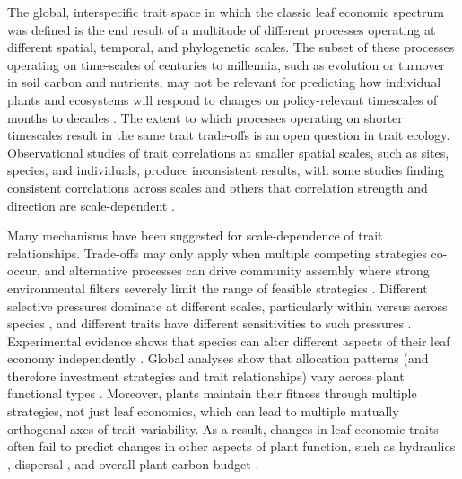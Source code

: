 \documentclass{article}
\begin{document}
The global, interspecific trait space in which the classic leaf economic spectrum was defined is the end result of a multitude of different processes operating at different spatial, temporal, and phylogenetic scales.
The subset of these processes operating on time-scales of centuries to millennia, such as evolution or turnover in soil carbon and nutrients,
may not be relevant for predicting how individual plants and ecosystems will respond to changes on policy-relevant timescales of months to decades \citep{shaw_2012_rapid}.
The extent to which processes operating on shorter timescales result in the same trait trade-offs is an open question in trait ecology.
Observational studies of trait correlations at smaller spatial scales, such as sites, species, and individuals, produce inconsistent results,
with some studies finding consistent correlations across scales \citep{wright_2004_worldwide,albert_2010_multi,asner_2014_amazonian}
and others that correlation strength and direction are scale-dependent  \citep{albert_2010_intraspecific_functional_variability,messier_2010_how,wright_2012_does,feng_2013_scale,grubb_2015_relationships,wigley_2016_leaf,messier_2017_interspecific,kichenin_2013_contrasting}.

Many mechanisms have been suggested for scale-dependence of trait relationships.
Trade-offs may only apply when multiple competing strategies co-occur, and alternative processes can drive community assembly where strong environmental filters severely limit the range of feasible strategies \citep{rosado_2017_relative,grime_2012_evolutionary}.
Different selective pressures dominate at different scales, particularly within versus across species \citep{albert_2010_intraspecific_functional_variability,messier_2010_how,kichenin_2013_contrasting},
and different traits have different sensitivities to such pressures \citep{messier_2016_trait}.
Experimental evidence shows that species can alter different aspects of their leaf economy independently \citep{wright_2012_does}.
Global analyses show that allocation patterns (and therefore investment strategies and trait relationships) vary across plant functional types \citep{ghimire_2017_global}.
Moreover, plants maintain their fitness through multiple strategies, not just leaf economics, which can lead to multiple mutually orthogonal axes of trait variability.
As a result, changes in leaf economic traits often fail to predict changes in other aspects of plant function, such as
hydraulics \citep{li_2015_leaf},
dispersal \citep{westoby_2002_plant_ecological_strategies},
and overall plant carbon budget \citep{edwards_2014_leaf}.
\end{document}
